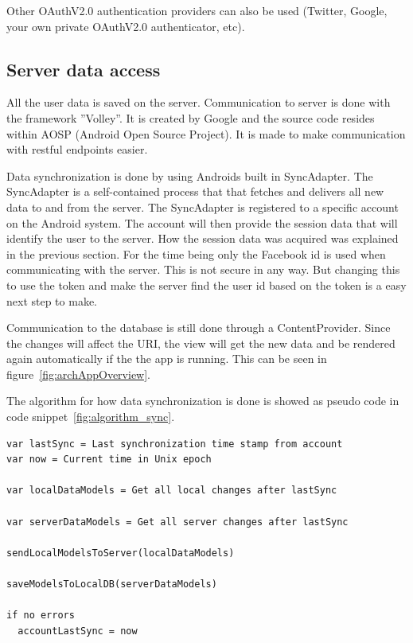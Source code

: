 Other OAuthV2.0 authentication providers can also be used (Twitter, Google, your own private OAuthV2.0 authenticator, etc). 


\subsection{Server data access}

All the user data is saved on the server. Communication to server is done with the framework ''Volley''. It is created by Google and the source code resides within AOSP (Android Open Source Project). It is made to make communication with restful endpoints easier.

Data synchronization is done by using Androids built in SyncAdapter. The SyncAdapter is a self-contained process that that fetches and delivers all new data to and from the server. The SyncAdapter is registered to a specific account on the Android system. The account will then provide the session data that will identify the user to the server. How the session data was acquired was explained in the previous section. For the time being only the Facebook id is used when communicating with the server. This is not secure in any way. But changing this to use the token and make the server find the user id based on the token is a easy next step to make.

Communication to the database is still done through a ContentProvider. Since the changes will affect the URI, the view will get the new data and be rendered again automatically if the the app is running. This can be seen in figure~\ref{fig:archAppOverview}.

The algorithm for how data synchronization is done is showed as pseudo code in code snippet~\ref{fig:algorithm_sync}.


\noindent\begin{minipage}{\textwidth}
\begin{lstlisting}[caption={Algorithm for the synchronization flow.}, label={fig:algorithm_sync}]
var lastSync = Last synchronization time stamp from account
var now = Current time in Unix epoch

var localDataModels = Get all local changes after lastSync

var serverDataModels = Get all server changes after lastSync

sendLocalModelsToServer(localDataModels)

saveModelsToLocalDB(serverDataModels)

if no errors
  accountLastSync = now
\end{lstlisting}
\end{minipage}

